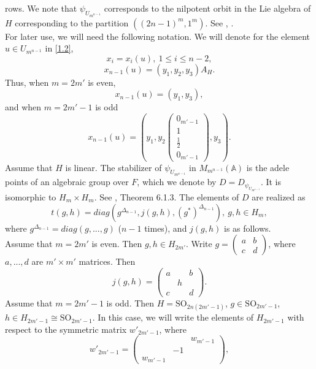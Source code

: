 \documentclass[12pts]{amsart}
\newcommand{\BA}{{\mathbb {A}}}
\newcommand{\SO}{{\mathrm{SO}}}
\begin{document}
rows. We note that $\psi_{U_{m^{n-1}}}$ corresponds to the nilpotent orbit in
the Lie algebra of $H$ corresponding to the partition
$((2n-1)^m, 1^m)$. See \cite{MW87}, \cite{GRS03}.\\
For later use, we will need the following notation. We will denote for the element $u\in U_{m^{n-1}}$ in \eqref{1.2},
$$
x_i=x_i(u),\ 1\leq i\leq n-2,
$$
\begin{equation}\label{1.5.1}
x_{n-1}(u)=(y_1,y_2,y_3)A_H.
\end{equation}
Thus, when $m=2m'$ is even,
$$
x_{n-1}(u)=(y_1,y_3),
$$
and when $m=2m'-1$ is odd
$$
x_{n-1}(u)=(y_1, y_2\begin{pmatrix}0_{m'-1}\\1\\ \frac{1}{2}\\0_{m'-1}\end{pmatrix},y_3).
$$
Assume that $H$ is linear. The stabilizer of $\psi_{U_{m^{n-1}}}$ in
$M_{m^{n-1}}(\BA)$ is the adele points of an algebraic group over $F$, which we denote by $D=D_{\psi_{U_{m^{n-1}}}}$. It is isomorphic to $H_m\times
H_m$. See \cite{CM93}, Theorem 6.1.3. The elements of $D$ are realized
as
\begin{equation}\label{1.6}
t(g,h)=diag(g^{\Delta_{n-1}},j(g,h),(g^*)^{\Delta_{n-1}}),\ g, h\in H_m,
\end{equation}
where $g^{\Delta_{n-1}}=diag(g,...,g)$ ($n-1$ times), and $j(g,h)$
is as follows.\\
Assume that $m=2m'$ is even. Then $g, h\in H_{2m'}$. Write
$g=\begin{pmatrix}a&b\\c&d\end{pmatrix}$, where $a,...,d$ are
$m'\times m'$ matrices. Then
\begin{equation}\label{1.7}
j(g,h)=\begin{pmatrix}a&&b\\&h\\c&&d\end{pmatrix}.
\end{equation}
Assume that $m=2m'-1$ is odd. Then $H=\SO_{2n(2m'-1)}$, $g\in \SO_{2m'-1}$, $h\in
H_{2m'-1}\cong\SO_{2m'-1}$. In this case, we will write the elements
of $H_{2m'-1}$ with respect to the symmetric matrix
$w'_{2m'-1}$, where
\begin{equation}\label{1.7.1}
w'_{2m'-1}=\begin{pmatrix}&&w_{m'-1}\\&-1\\w_{m'-1}\end{pmatrix},
\end{equation}
\end{document}
